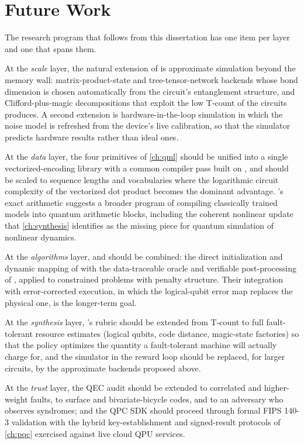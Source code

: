 \section{Future Work}\label{sec:conclusion:future}

The research program that follows from this dissertation has one item per layer and one that spans them.

At the \emph{scale} layer, the natural extension of \qgear{} is approximate simulation beyond the memory wall: matrix-product-state and tree-tensor-network backends whose bond dimension is chosen automatically from the circuit's entanglement structure, and Clifford-plus-magic decompositions that exploit the low T-count of the circuits \rubriq{} produces. A second extension is hardware-in-the-loop simulation in which the noise model is refreshed from the device's live calibration, so that the simulator predicts hardware results rather than ideal ones.

At the \emph{data} layer, the four primitives of \cref{ch:qml} should be unified into a single vectorized-encoding library with a common compiler pass built on \shardq{}, and \vqt{} should be scaled to sequence lengths and vocabularies where the logarithmic circuit complexity of the vectorized dot product becomes the dominant advantage. \nnqa's exact arithmetic suggests a broader program of compiling classically trained models into quantum arithmetic blocks, including the coherent nonlinear update that \cref{ch:synthesis} identifies as the missing piece for quantum simulation of nonlinear dynamics.

At the \emph{algorithms} layer, \deal{} and \qawa{} should be combined: the direct initialization and dynamic mapping of \deal{} with the data-traceable oracle and verifiable post-processing of \qawa{}, applied to constrained problems with penalty structure. Their integration with error-corrected execution, in which the logical-qubit error map replaces the physical one, is the longer-term goal.

At the \emph{synthesis} layer, \rubriq's rubric should be extended from T-count to full fault-tolerant resource estimates (logical qubits, code distance, magic-state factories) so that the policy optimizes the quantity a fault-tolerant machine will actually charge for, and the simulator in the reward loop should be replaced, for larger circuits, by the approximate backends proposed above.

At the \emph{trust} layer, the QEC audit should be extended to correlated and higher-weight faults, to surface and bivariate-bicycle codes, and to an adversary who observes syndromes; and the QPC SDK should proceed through formal FIPS 140-3 validation with the hybrid key-establishment and signed-result protocols of \cref{ch:pqc} exercised against live cloud QPU services.

